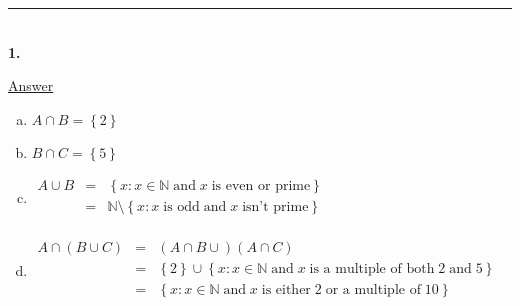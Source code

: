 \documentclass{article}[10pt]
\newenvironment{exercise}[1]
    {\noindent\rule{2cm}{0.4pt} \\
     \textbf{#1.}}
    {}
\newcommand{\answer}{

  \underline{Answer}

}
\begin{document}
\begin{exercise}{1}
  \answer
  \begin{enumerate}[(a)]
    \item $A \cap B = \left\{ 2 \right\}$
    \item $B \cap C = \left\{ 5 \right\}$
    \item $\begin{array}{rcl}
      A \cup B
      & = & \left\{ x : x \in \mathds{N} \operatorname{and}
                        x \;\text{is even or prime} \right\} \\
      & = & \mathds{N} \setminus
            \left\{ x : x \;\text{is odd} \operatorname{and}
                        x \;\text{isn't prime} \right\} \\
    \end{array}$
    \item $\begin{array}{rcl}
      A \cap \left( B \cup C \right)
      & = & \left( A \cap B \cup \right) \left( A \cap C \right) \\
      & = & \left\{ 2 \right\} \cup
            \left\{ x : x \in \mathds{N} \operatorname{and}
                        x \;\text{is a multiple of both}\; 2
                         \;\text{and}\; 5 \right\} \\
      & = & \left\{ x : x \in \mathds{N} \operatorname{and}
                        x \;\text{is either}\; 2
                          \;\text{or a multiple of}\; 10 \right\} \\
    \end{array}$
  \end{enumerate}

\end{exercise}
\end{document}
